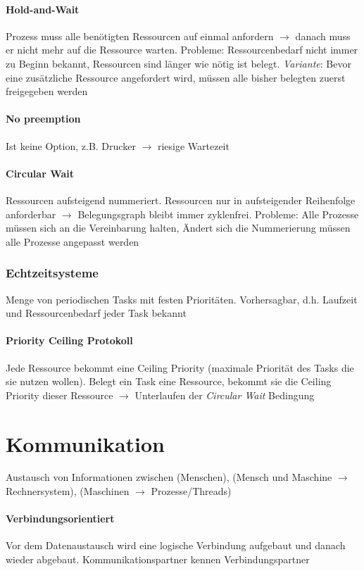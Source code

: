 \documentclass[11pt,a4paper,landscape]{article}
\begin{document}
\begin{multicols*}{3}
	\paragraph{Hold-and-Wait} Prozess muss alle benötigten Ressourcen auf einmal anfordern $\rightarrow$ danach muss er nicht mehr auf die Ressource warten. Probleme: Ressourcenbedarf nicht immer zu Beginn bekannt, Ressourcen sind länger wie nötig ist belegt. \textit{Variante}: Bevor eine zusätzliche Ressource angefordert wird, müssen alle bisher belegten zuerst freigegeben werden
	\paragraph{No preemption} Ist keine Option, z.B. Drucker $\rightarrow$ riesige Wartezeit
	\paragraph{Circular Wait} Ressourcen aufsteigend nummeriert. Ressourcen nur in aufsteigender Reihenfolge anforderbar $\rightarrow$ Belegungsgraph bleibt immer zyklenfrei. Probleme: Alle Prozesse müssen sich an die Vereinbarung halten, Ändert sich die Nummerierung müssen alle Prozesse angepasst werden
	\subsubsection{Echtzeitsysteme}
	Menge von periodischen Tasks mit festen Prioritäten. Vorhersagbar, d.h. Laufzeit und Ressourcenbedarf jeder Task bekannt
	\paragraph{Priority Ceiling Protokoll} Jede Ressource bekommt eine Ceiling Priority (maximale Priorität des Tasks die sie nutzen wollen). Belegt ein Task eine Ressource, bekommt sie die Ceiling Priority dieser Ressource $\rightarrow$ Unterlaufen der \textit{Circular Wait} Bedingung
	\section{Kommunikation}
	Austausch von Informationen zwischen (Menschen), (Mensch und Maschine $\rightarrow$ Rechnersystem), (Maschinen $\rightarrow$ Prozesse/Threads)
	\paragraph{Verbindungsorientiert} Vor dem Datenaustausch wird eine logische Verbindung aufgebaut und danach wieder abgebaut. Kommunikationspartner kennen Verbindungspartner

\end{multicols*}
\end{document}
